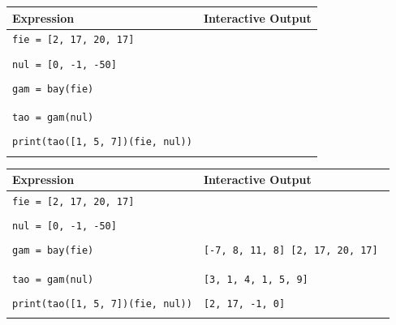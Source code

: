 \documentclass{exam}
\begin{document}
\begin{questions}
\begin{lstlisting}
\end{lstlisting}
\vspace{1 cm}
\begin{center}
    \begin{tabular}{|m{8cm}|m{6cm}|}
\hline
\textbf{Expression} & \textbf{Interactive Output} \\
\hline
\lstinline$fie = [2, 17, 20, 17]$ &  \\ & \\
\hline
\lstinline$nul = [0, -1, -50]$ & \\ & \\
\hline
\lstinline$gam = bay(fie)$ & \\ & \\ & \\
\hline
\lstinline$tao = gam(nul)$ & \\ & \\
\hline
\lstinline$print(tao([1, 5, 7])(fie, nul))$& \\ & \\
\hline
\end{tabular}
\end{center}
\clearpage
\begin{solution}
\begin{center}
    \begin{tabular}{|m{8cm}|m{6cm}|}
\hline
\textbf{Expression} & \textbf{Interactive Output} \\
\hline
\lstinline$fie = [2, 17, 20, 17]$ &  \\ & \\
\hline
\lstinline$nul = [0, -1, -50]$ & \\ & \\
\hline
\lstinline$gam = bay(fie)$ & \color{red}\texttt{[-7, 8, 11, 8] [2, 17, 20, 17]
}\\ & \\ & \\
\hline
\lstinline$tao = gam(nul)$ & \color{red}\texttt{[3, 1, 4, 1, 5, 9]}\\ & \\
\hline
\lstinline$print(tao([1, 5, 7])(fie, nul))$& \color{red}\texttt{[2, 17, -1, 0]}\\ & \\
\hline
\end{tabular}
\end{center}
\end{solution}
\end{questions}
\end{document}
